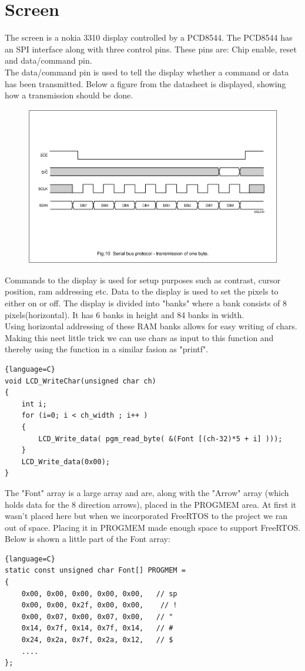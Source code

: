 \section{Screen}
The screen is a nokia 3310 display controlled by a PCD8544. The PCD8544 has an SPI interface along with three control pins. These pins are: Chip enable, reset and data/command pin.\\
The data/command pin is used to tell the display whether a command or data has been transmitted. Below a figure from the datasheet is displayed, showing how a transmission should be done.

\begin{figure}[H]
\centering
\includegraphics[width=.8\textwidth]{billeder/Display_protocol}
\end{figure}

Commands to the display is used for setup purposes such as contrast, cursor position, ram addressing etc. Data to the display is used to set the pixels to either on or off. The display is divided into "banks" where a bank consists of 8 pixels(horizontal). It has 6 banks in height and 84 banks in width.\\
Using horizontal addressing of these RAM banks allows for easy writing of chars. Making this neet little trick we can use chars as input to this function and thereby using the function in a similar fasion as "printf".
\begin{lstlisting}{language=C}
void LCD_WriteChar(unsigned char ch)
{
	int i;
	for (i=0; i < ch_width ; i++ )
	{
		LCD_Write_data( pgm_read_byte( &(Font [(ch-32)*5 + i] )));	
	}
	LCD_Write_data(0x00);			
}
\end{lstlisting}
The "Font" array is a large array and are, along with the "Arrow" array (which holds data for the 8 direction arrows), placed in the PROGMEM area. At first it wasn't placed here but when we incorporated FreeRTOS to the project we ran out of space. Placing it in PROGMEM made enough space to support FreeRTOS.\\
Below is shown a little part of the Font array:
\begin{lstlisting}{language=C}
static const unsigned char Font[] PROGMEM =
{
	0x00, 0x00, 0x00, 0x00, 0x00,   // sp 
	0x00, 0x00, 0x2f, 0x00, 0x00,    // ! 
	0x00, 0x07, 0x00, 0x07, 0x00,   // "  
	0x14, 0x7f, 0x14, 0x7f, 0x14,   // #  
	0x24, 0x2a, 0x7f, 0x2a, 0x12,   // $  
	....  
};
\end{lstlisting}

